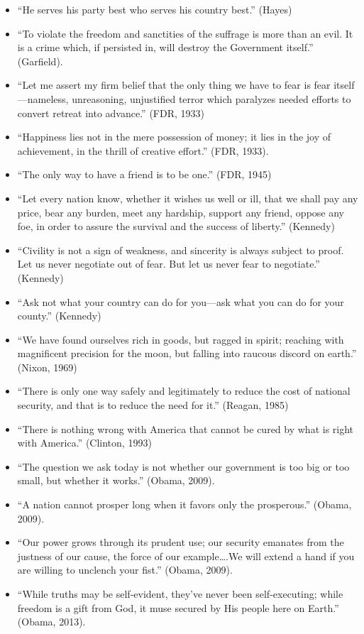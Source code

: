 \documentclass[
]{article}
\begin{document}
\begin{itemize}
\item
  ``He serves his party best who serves his country best.'' (Hayes)
\item
  ``To violate the freedom and sanctities of the suffrage is more than
  an evil. It is a crime which, if persisted in, will destroy the
  Government itself.'' (Garfield).
\item
  ``Let me assert my firm belief that the only thing we have to fear is
  fear itself---nameless, unreasoning, unjustified terror which
  paralyzes needed efforts to convert retreat into advance.'' (FDR,
  1933)
\item
  ``Happiness lies not in the mere possession of money; it lies in the
  joy of achievement, in the thrill of creative effort.'' (FDR, 1933).
\item
  ``The only way to have a friend is to be one.'' (FDR, 1945)
\item
  ``Let every nation know, whether it wishes us well or ill, that we
  shall pay any price, bear any burden, meet any hardship, support any
  friend, oppose any foe, in order to assure the survival and the
  success of liberty.'' (Kennedy)
\item
  ``Civility is not a sign of weakness, and sincerity is always subject
  to proof. Let us never negotiate out of fear. But let us never fear to
  negotiate.'' (Kennedy)
\item
  ``Ask not what your country can do for you---ask what you can do for
  your county.'' (Kennedy)
\item
  ``We have found ourselves rich in goods, but ragged in spirit;
  reaching with magnificent precision for the moon, but falling into
  raucous discord on earth.'' (Nixon, 1969)
\item
  ``There is only one way safely and legitimately to reduce the cost of
  national security, and that is to reduce the need for it.'' (Reagan,
  1985)
\item
  ``There is nothing wrong with America that cannot be cured by what is
  right with America.'' (Clinton, 1993)
\item
  ``The question we ask today is not whether our government is too big
  or too small, but whether it works.'' (Obama, 2009).
\item
  ``A nation cannot prosper long when it favors only the prosperous.''
  (Obama, 2009).
\item
  ``Our power grows through its prudent use; our security emanates from
  the justness of our cause, the force of our example\ldots.We will
  extend a hand if you are willing to unclench your fist.'' (Obama,
  2009).
\item
  ``While truths may be self-evident, they've never been self-executing;
  while freedom is a gift from God, it muse secured by His people here
  on Earth.'' (Obama, 2013).
\end{itemize}
\end{document}
